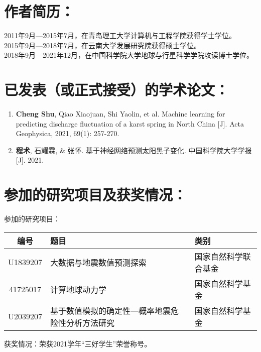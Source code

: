 \section*{作者简历：}
\noindent 2011年9月---2015年7月，在青岛理工大学计算机与工程学院获得学士学位。\\
\noindent 2015年9月---2018年7月，在云南大学发展研究院获得硕士学位。\\
\noindent 2018年9月---2021年12月，在中国科学院大学地球与行星科学学院攻读博士学位。


\section*{已发表（或正式接受）的学术论文：}
{\setlist[enumerate]{}
\begin{enumerate}[nosep]
  \item \textbf{Cheng Shu}, Qiao Xiaojuan, Shi Yaolin, et al. Machine learning for predicting discharge fluctuation of a karst spring in North China [J]. Acta Geophysica, 2021, 69(1): 257-270.
  \item \textbf{程术}, 石耀霖, \& 张怀. 基于神经网络预测太阳黑子变化. 中国科学院大学学报 [J]. 2021.
\end{enumerate}}


\section*{参加的研究项目及获奖情况：}

\noindent 参加的研究项目：
\begin{table}[htbp]
\footnotesize
\begin{tabular}{cll}
  \toprule
  编号 & 题目 & 类别 \\
  \midrule
  U1839207 & 大数据与地震数值预测探索 & 国家自然科学联合基金 \\
  41725017 & 计算地球动力学 & 国家自然科学基金 \\
  U2039207 & 基于数值模拟的确定性---概率地震危险性分析方法研究 & 国家自然科学基金 \\
  \bottomrule
  \end{tabular}
\end{table}

\noindent 获奖情况：荣获2021学年“三好学生”荣誉称号。

\cleardoublepage[plain] 

